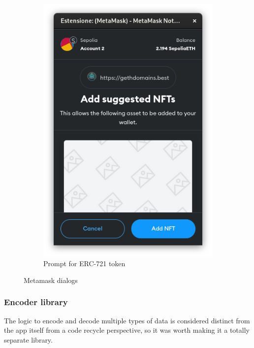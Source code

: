 \documentclass[main.tex]{subfiles}
\begin{document}
\begin{figure}[htbp]
\begin{subfigure}[t]{0.45\textwidth}
        \includegraphics[width=\textwidth]{figures/metamask_prompt_add_geth_domain_nft.png}
        \caption{Prompt for ERC-721 token}
    \end{subfigure}
    
    \caption{Metamask dialogs}
    \label{fig:metamask_notification_prompts}
\end{figure}

\subsubsection{Encoder library}
The logic to encode and decode multiple types of data is considered distinct from the app itself from a code recycle perspective, so it was worth making it a totally separate library.
\end{document}
